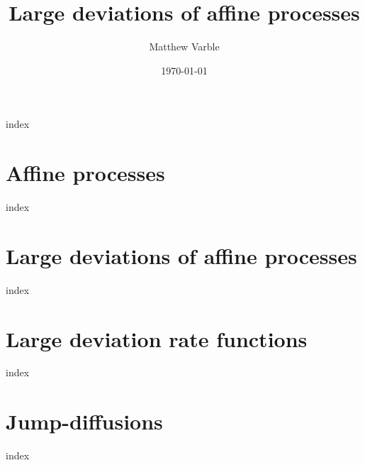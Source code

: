 \documentclass[leqno]{./preamble/dissertation}
\title{Large deviations of affine processes}
\author{Matthew Varble}
\date{\today}
\begin{document}
\renewcommand{\theequation}{\arabic{equation}}

\maketitle

\frontmatter
{index}


\mainmatter

\renewcommand{\theequation}{\thechapter.\arabic{equation}}

\chapter{Affine processes}
\label{affine-processes}
{index}

\chapter{Large deviations of affine processes}
\label{large-deviations}
{index}

\chapter{Large deviation rate functions}
\label{rate-functions}
{index}

\appendix

\chapter{Jump-diffusions}
\label{jump-diffusions}
{index}

\clearpage

\end{document}
